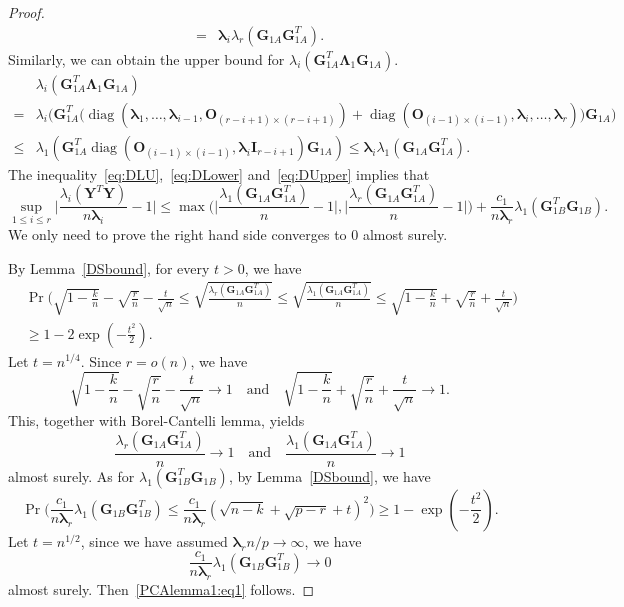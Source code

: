 \documentclass[12pt]{article} %
\DeclareMathOperator{\mydiag}{diag}
\newcommand{\bY}{\mathbf{Y}}
\newcommand{\bG}{\mathbf{G}}
\newcommand{\bO}{\mathbf{O}}
\newcommand{\bI}{\mathbf{I}}
\newcommand{\bfsym}[1]{\ensuremath{\boldsymbol{#1}}}
\def\blambda {\bfsym {\lambda}}
\def\bLambda {\bfsym {\Lambda}}
\theoremstyle{definition}
\begin{document}
\begin{appendices}
\begin{proof}
\begin{equation}
\begin{aligned}
= &
\blambda_i \lambda_r(\bG_{1A}\bG_{1A}^T).
\end{aligned}
\end{equation}
Similarly, we can obtain the upper bound for
$\lambda_i(\bG_{1A}^T \bLambda_1 \bG_{1A})$.
\begin{equation}\label{eq:DUpper}
\begin{aligned}
&\lambda_i(\bG_{1A}^T \bLambda_1 \bG_{1A})
\\
=&\lambda_i\Big(
\bG_{1A}^T \big(
\mydiag(\blambda_1,\ldots,\blambda_{i-1},\bO_{(r-i+1)\times(r-i+1)})+
\mydiag(\bO_{(i-1)\times(i-1)},\blambda_i,\ldots,\blambda_r)
\big)
\bG_{1A}
\Big)\\
    \leq&
\lambda_1(\bG_{1A}^T \mydiag(\bO_{(i-1)\times(i-1)},\blambda_i \bI_{r-i+1}) \bG_{1A})
\leq  \blambda_i \lambda_1(\bG_{1A}\bG_{1A}^T).
\end{aligned}
\end{equation}
    The inequality~\eqref{eq:DLU},~\eqref{eq:DLower} and~\eqref{eq:DUpper} implies that
    $$
   \sup_{1\leq i \leq r} \Big|\frac{\lambda_i(\bY^T \bY)}{n\blambda_i}-1\Big|\leq
    \max\Big(\Big|\frac{\lambda_1(\bG_{1A}\bG_{1A}^T)}{n}-1\Big|,\Big|\frac{\lambda_r(\bG_{1A}\bG_{1A}^T)}{n}-1\Big|\Big)+\frac{c_1}{n\blambda_r}\lambda_1(\bG_{1B}^T \bG_{1B}).
    $$
    We only need to prove the right hand side converges to $0$ almost surely.

    By Lemma~\ref{DSbound}, for every $t>0$, we have
    \begin{equation}\label{yaohuo2}
    \begin{aligned}
        &\Pr\Big(\sqrt{1-\frac{k}{n}}-\sqrt{\frac{r}{n}}-\frac{t}{\sqrt{n}}\leq \sqrt{\frac{\lambda_r(\bG_{1A}\bG_{1A}^T)}{n}}\leq \sqrt{\frac{\lambda_1(\bG_{1A}\bG_{1A}^T)}{n}}\leq
        \sqrt{1-\frac{k}{n}}+\sqrt{\frac{r}{n}}+\frac{t}{\sqrt{n}} \Big) \\
        &\geq 1-2\exp(-\frac{t^2}{2}).
    \end{aligned}
    \end{equation}
    Let $t=n^{1/4}$. Since $r=o(n)$, we have
    $$
\sqrt{1-\frac{k}{n}}-\sqrt{\frac{r}{n}}-\frac{t}{\sqrt{n}}\to 1\quad\text{and}\quad
\sqrt{1-\frac{k}{n}}+\sqrt{\frac{r}{n}}+\frac{t}{\sqrt{n}}\to 1.
    $$
    This, together with Borel-Cantelli lemma, yields 
    $$
    \frac{\lambda_r(\bG_{1A}\bG_{1A}^T)}{n}\to 1\quad\text{and}\quad
    \frac{\lambda_1(\bG_{1A}\bG_{1A}^T)}{n}\to 1
    $$
    almost surely.
    As for $\lambda_1(\bG_{1B}^T \bG_{1B})$, by Lemma~\ref{DSbound}, we have
   \begin{equation}\label{yaohuo3}
   \Pr\Big( \frac{c_1}{n\blambda_r}{\lambda_1(\bG_{1B}\bG_{1B}^T)}\leq \frac{c_1}{n\blambda_r}(\sqrt{n-k}+\sqrt{p-r}+t)^2 \Big) 
   \geq 1-\exp(-\frac{t^2}{2}).
   \end{equation}
Let $t=n^{1/2}$, since we have assumed $\blambda_r n/p\to \infty$, we have $$\frac{c_1}{n\blambda_r}{\lambda_1(\bG_{1B}\bG_{1B}^T)}\to 0$$
almost surely.
Then~\eqref{PCAlemma1:eq1} follows.


\end{proof}
\end{appendices}
\end{document}

